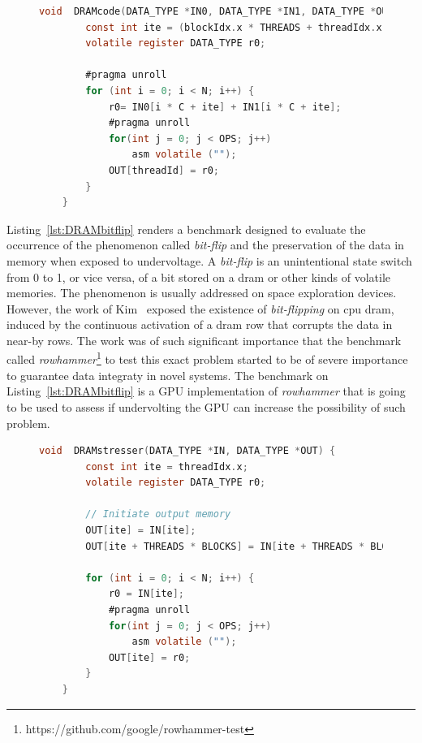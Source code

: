 \begin{figure}[h]
    \begin{lstlisting}[language=C, caption=DRAM Benchmark Code, label=lst:DRAMbench, basicstyle=\footnotesize\ttfamily,abovecaptionskip=0pt, captionpos=b]
    void  DRAMcode(DATA_TYPE *IN0, DATA_TYPE *IN1, DATA_TYPE *OUT) {
        const int ite = (blockIdx.x * THREADS + threadIdx.x) % MEM_BLOCK;
        volatile register DATA_TYPE r0;
        
        #pragma unroll
        for (int i = 0; i < N; i++) {
            r0= IN0[i * C + ite] + IN1[i * C + ite];
            #pragma unroll
            for(int j = 0; j < OPS; j++)  
                asm volatile ("");
            OUT[threadId] = r0;
        }
    }
    \end{lstlisting}
\end{figure}

Listing~\ref{lst:DRAMbitflip} renders a benchmark designed to evaluate the occurrence of the phenomenon called \textit{bit-flip} and the preservation of the data in memory when exposed to undervoltage. A \textit{bit-flip} is an unintentional state switch from 0 to 1, or vice versa, of a bit stored on a \acrshort{dram} or other kinds of volatile memories. The phenomenon is usually addressed on space exploration devices. However, the work of Kim~\cite{kim_flipping_2014} exposed the existence of \textit{bit-flipping} on \acrshort{cpu} \acrshort{dram}, induced by the continuous activation of a \acrshort{dram} row that corrupts the data in near-by rows. The work was of such significant importance that the benchmark called \textit{rowhammer}\footnote{https://github.com/google/rowhammer-test} to test this exact problem started to be of severe importance to guarantee data integraty in novel systems. The benchmark on Listing~\ref{lst:DRAMbitflip} is a GPU implementation of \textit{rowhammer} that is going to be used to assess if undervolting the GPU can increase the possibility of such problem.

\begin{figure}[h]
    \begin{lstlisting}[language=C, caption=DRAM Bit-Flip Stress Test Code - \textit{rowhammer} inspired  benchmark, label=lst:DRAMbitflip, basicstyle=\footnotesize\ttfamily,abovecaptionskip=0pt, captionpos=b]
    void  DRAMstresser(DATA_TYPE *IN, DATA_TYPE *OUT) {
        const int ite = threadIdx.x;
        volatile register DATA_TYPE r0;
        
        // Initiate output memory
        OUT[ite] = IN[ite];
        OUT[ite + THREADS * BLOCKS] = IN[ite + THREADS * BLOCKS];
        
        for (int i = 0; i < N; i++) {
            r0 = IN[ite];
            #pragma unroll
            for(int j = 0; j < OPS; j++)  
                asm volatile ("");
            OUT[ite] = r0;
        }
    }
    \end{lstlisting}
\end{figure}

